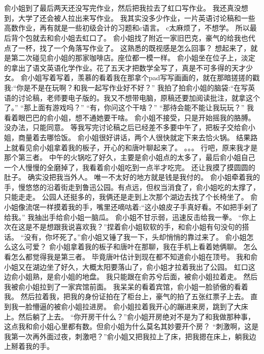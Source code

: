 \chapter{}
俞小姐到了最后两天还没写完作业，然后把我拉去了虹口写作业。
我还真没想到，大学了还会被人拉出来写作业。
我其实没多少作业，一片英语讨论稿和一些高数作业，再有就是一些初级会计的习题和c语言。
c太麻烦了，不想学。
所以最后背个包就去和俞小姐去虹口了。
俞小姐找了附近一家旧巴克，豪气的给我也代点了一杯，找了一个角落写作业了。
这熟悉的既视感是怎么回事？
想起来了，就是第二次碰见俞小姐的那家咖啡店。座位都一模一样。
俞小姐坐在位子上，淡定的拿出了语文英语化学作业。花了五天才把数学全写了，真是不可多得的天才少女。
俞小姐写着写着，羡慕的看着我在那拿个pad写写画画的，就在那暗搓搓的戳我:“你是不是在玩啊？和我一起写作业好不好？”
我拍了拍俞小姐的脑袋:“在写英语的讨论稿，老师要电子版的。我又不想带电脑，原稿还要加阅读批注，就拿这个了。”
“那上面有游戏吗？”
“有，你问这个干啥？”
“那待会能不能让我玩玩？”
我看着眼巴巴的俞小姐，想不通她要干啥。
俞小姐不接受，只是开始摇我的胳膊。没办法，只能同意。
等我写完讨论稿之后已经差不多要中午了，把板子交给俞小姐，商量着去哪恰饭。
俞小姐很好讲话，两个人很快就定下来去恰火锅。
结果路上就看见俞小姐拿着我的板子，开心的和唐叶聊起来了。
。。。
行吧，原来我才是那个第三者。
中午的火锅吃了好久，主要是俞小姐点的太多了，最后俞小姐自己一个人慢慢的全磨掉了，我看着俞小姐吃到一点半才吃完。
还让我摸了摸圆圆的肚子。
确实没把我当外人。
唯一不太好的地方就是钱是我付的。
俞小姐牵着我的手，慢悠悠的沿着街走到鲁迅公园。有点远，但权当消食了，俞小姐吃的太撑了，只能走走。
公园人还挺多的，我俩还是走到上次那个湖边去找了个长椅坐了。
俞小姐像流氓一样摸着我的手，嘴里还嘀咕着:“这小娘皮子手真好看。不如把手剁了给我。”
我抽出手给俞小姐一脑瓜。
俞小姐不甘示弱，迅速反击给我一拳。
“你上次在这是不是想跟我说喜欢我？”捏着俞小姐软软的手，和俞小姐有句没句的搭话。
“没有，你坏死了。”俞小姐又锤了我一下，头却悄悄的靠过来了。
俞小姐怎么这么可爱？
俞小姐拿着我的板子和唐叶在那聊，我在手机上看着她俩聊。
怎么看怎么都觉得我是第三者。
毕竟唐叶估计到现在都不知道俞小姐在顶号。
我和俞小姐又在湖边坐了好久，大概太阳要落山了，俞小姐才拉着我出了公园。
虹口这边俞小姐熟，是俞小姐的地盘。
我只能跟在俞苏兮后面，被俞小姐拉着走。
然后我被俞小姐拉到了一家宾馆前面。
我呆呆的看着宾馆，俞小姐一脸骄傲的看着我。
然后拉着我，把我的身份证拍在了柜台上，豪气的拍了五张红票子上去。
直到我一脸懵逼的被俞小姐拉进房。
俞小姐拉着我开心的蹦进来房，跳到了大床上。然后躺了上去。
“你开房干什么？”俞小姐开房绝对不是为了和我做那种事，这点我和俞小姐心里都有数。但俞小姐为什么莫名其妙要开个房？
“刺激啊，这是我第一次再外面过夜，刺激吧？”俞小姐又把我拉上了床，把我摁在床上，躺我边上掰着我的手。
